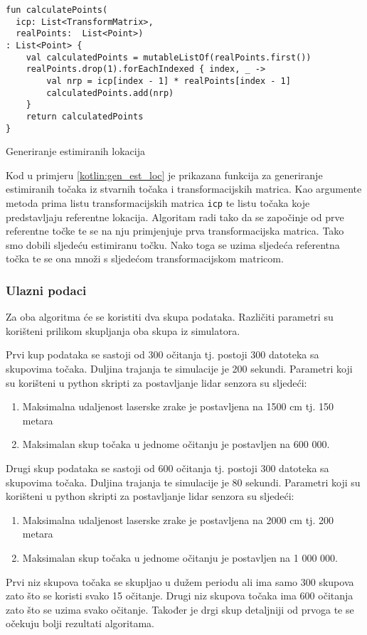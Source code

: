 \begin{listing}[h!]
  \begin{verbatim}
fun calculatePoints(
  icp: List<TransformMatrix>,
  realPoints:  List<Point>)
: List<Point> {
    val calculatedPoints = mutableListOf(realPoints.first())
    realPoints.drop(1).forEachIndexed { index, _ ->
        val nrp = icp[index - 1] * realPoints[index - 1]
        calculatedPoints.add(nrp)
    }
    return calculatedPoints
}
  \end{verbatim}
  \caption{Generiranje estimiranih lokacija}
  \label{kotlin:gen_est_loc}
\end{listing}

Kod u primjeru \ref{kotlin:gen_est_loc} je prikazana funkcija za generiranje estimiranih točaka iz stvarnih točaka i transformacijskih matrica. Kao argumente metoda prima listu transformacijskih matrica \texttt{icp} te listu točaka koje predstavljaju referentne lokacija. Algoritam radi tako da se započinje od prve referentne točke te se na nju primjenjuje prva transformacijska matrica. Tako smo dobili sljedeću estimiranu točku. Nako toga se uzima sljedeća referentna točka te se ona množi s sljedećom transformacijskom matricom.

\subsubsection{Ulazni podaci}

Za oba algoritma će se koristiti dva skupa podataka. Različiti parametri su korišteni prilikom skupljanja oba skupa iz simulatora.

Prvi kup podataka se sastoji od 300 očitanja tj. postoji 300 datoteka sa skupovima točaka. Duljina trajanja te simulacije je 200 sekundi. Parametri koji su korišteni u python skripti za postavljanje lidar senzora su sljedeći:
\begin{enumerate}
  \item Maksimalna udaljenost laserske zrake je postavljena na 1500 cm tj. 150 metara
  \item Maksimalan skup točaka u jednome očitanju je postavljen na 600 000.
\end{enumerate}

Drugi skup podataka se sastoji od 600 očitanja tj. postoji 300 datoteka sa skupovima točaka. Duljina trajanja te simulacije je 80 sekundi. Parametri koji su korišteni u python skripti za postavljanje lidar senzora su sljedeći:
\begin{enumerate}
  \item Maksimalna udaljenost laserske zrake je postavljena na 2000 cm tj. 200 metara
  \item Maksimalan skup točaka u jednome očitanju je postavljen na 1 000 000.
\end{enumerate}


Prvi niz skupova točaka se skupljao u dužem periodu ali ima samo 300 skupova zato što se koristi svako 15 očitanje. Drugi niz skupova točaka ima 600 očitanja zato što se uzima svako očitanje. Također je drgi skup detaljniji od prvoga te se očekuju bolji rezultati algoritama.